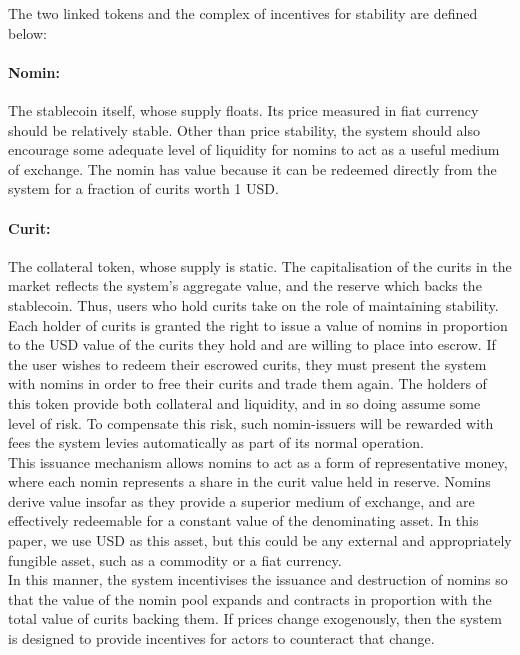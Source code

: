 \noindent The two linked tokens and the complex of incentives for stability are defined below:

\paragraph{Nomin:} The stablecoin itself, whose supply floats. Its price measured in fiat currency should be relatively stable.
Other than price stability, the system should also encourage some adequate level of liquidity for nomins
to act as a useful medium of exchange. The nomin has value because it can be redeemed directly from the system for a fraction of curits worth 1 USD.

\paragraph{Curit:} The collateral token, whose supply is static.
The capitalisation of the curits in the market reflects the system's aggregate value, and the reserve
which backs the stablecoin. Thus, users who hold curits take on the role of maintaining stability. \\

\noindent Each holder of curits is granted the right to issue a value of nomins in proportion to the USD value
of the curits they hold and are willing to place into escrow. If the user wishes to redeem their escrowed curits, they must
present the system with nomins in order to free their curits and trade them again.
The holders of this token provide both collateral and liquidity, and in so doing assume some
level of risk. To compensate this risk, such nomin-issuers will be rewarded with fees the system levies
automatically as part of its normal operation. \\

\noindent This issuance mechanism allows nomins to act as a form of representative money, where 
each nomin represents a share in the curit value held in reserve. Nomins derive value insofar as they provide
a superior medium of exchange, and are effectively redeemable for a constant value
of the denominating asset. In this paper, we use USD as this asset, but this could be any external
and appropriately fungible asset, such as a commodity or a fiat currency.  \\

\noindent In this manner, the system incentivises the issuance and destruction of nomins so that the value of
the nomin pool expands and contracts in proportion with the total value of curits backing them.
If prices change exogenously, then the system is designed to provide incentives for actors to
counteract that change. \\


